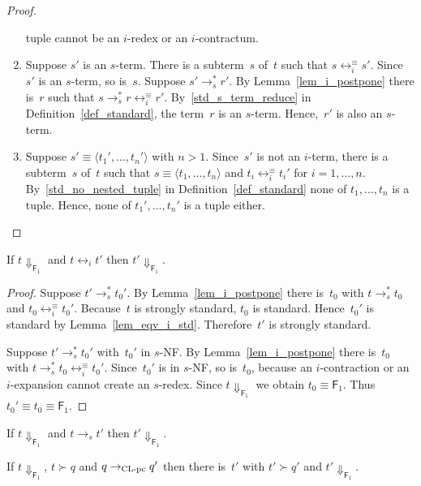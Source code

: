 \documentclass[a4paper,UKenglish]{lipics-v2016}
\newcommand{\Fs}{\mathsf{F}}
\newcommand{\Da}{\ensuremath{\Downarrow}}
\newcommand{\eqv}{\ensuremath{\leftrightarrow}}
\newcommand{\la}{\ensuremath{\langle}}
\newcommand{\ra}{\ensuremath{\rangle}}
\newcommand{\sCLCz}{\ensuremath{\text{\rm CL-pc}}}
\newcommand{\equiverased}{\succ}
\begin{document}
\begin{proof}
\begin{enumerate}
    tuple cannot be an $i$-redex or an $i$-contractum.
  \item Suppose $s'$ is an $s$-term. There is a subterm~$s$ of~$t$
    such that $s \eqv_{i}^{\equiv} s'$. Since~$s'$ is an $s$-term, so
    is~$s$. Suppose $s' \to_s^{*} r'$. By Lemma~\ref{lem_i_postpone}
    there is~$r$ such that $s \to_s^{*} r \eqv_{i}^{\equiv}
    r'$. By~\ref{std_s_term_reduce} in Definition~\ref{def_standard},
    the term~$r$ is an $s$-term. Hence,~$r'$ is also an $s$-term.
  \item Suppose $s' \equiv \la t_1',\ldots,t_n' \ra$ with $n >
    1$. Since~$s'$ is not an $i$-term, there is a subterm~$s$ of~$t$
    such that $s \equiv \la t_1,\ldots,t_n \ra$ and
    $t_i \eqv_{i}^{\equiv} t_i'$ for
    $i=1,\ldots,n$. By~\ref{std_no_nested_tuple} in
    Definition~\ref{def_standard} none of $t_1,\ldots,t_n$ is a
    tuple. Hence, none of $t_1',\ldots,t_n'$ is a tuple either.
  \end{enumerate}
\end{proof}

\begin{lemma}\label{lem_eqv_i}
  If $t \Da_{\Fs_1}$ and $t \eqv_{i} t'$ then $t' \Da_{\Fs_1}$.
\end{lemma}

\begin{proof}
  Suppose $t' \to_s^{*} t_0'$. By Lemma~\ref{lem_i_postpone} there
  is~$t_0$ with $t \to_s^{*} t_0$ and $t_0 \eqv_{i}^\equiv
  t_0'$. Because~$t$ is strongly standard, $t_0$ is
  standard. Hence~$t_0'$ is standard by
  Lemma~\ref{lem_eqv_i_std}. Therefore~$t'$ is strongly standard.

  Suppose $t' \to_s^{*} t_0'$ with~$t_0'$ in $s$-NF. By
  Lemma~\ref{lem_i_postpone} there is~$t_0$ with
  $t \to_s^{*} t_0 \eqv_{i}^{\equiv} t_0'$. Since~$t_0'$ is in $s$-NF,
  so is~$t_0$, because an $i$-contraction or an $i$-expansion cannot
  create an $s$-redex. Since $t \Da_{\Fs_1}$ we obtain
  $t_0 \equiv \Fs_1$. Thus $t_0' \equiv t_0 \equiv \Fs_1$.
\end{proof}

\begin{lemma}\label{lem_contr_s}
  If $t \Da_{\Fs_1}$ and $t \to_s t'$ then $t' \Da_{\Fs_1}$.
\end{lemma}

\begin{corollary}\label{cor_contr}
  If $t \Da_{\Fs_1}$, $t \equiverased q$ and $q \to_{\sCLCz} q'$ then
  there is~$t'$ with $t' \equiverased q'$ and $t' \Da_{\Fs_1}$.
\end{corollary}
\end{document}
